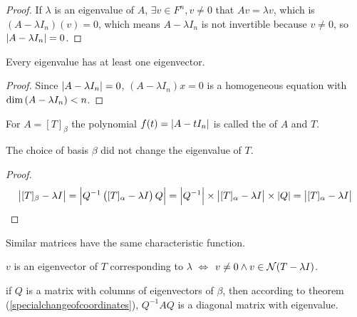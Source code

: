 \begin{proof}
    If $\lambda$ is an eigenvalue of $A$, $\exists v \in F^n, v \neq 0$ that $A v = \lambda v$, which is $(A - \lambda I_n)(v)= 0$, which means $A - \lambda I_n$ is not invertible because $v \neq 0$, so $\displaystyle \left| \displaystyle A - \lambda I_n \right| = 0$.
\end{proof}

\begin{theorem}
    Every eigenvalue has at least one eigenvector.    
\end{theorem}
\begin{proof}
    Since $\displaystyle \left| \displaystyle A - \lambda I_n \right| = 0$, $(A - \lambda I_n) x = 0$ is a homogeneous equation with $\displaystyle \text{dim}\left( A - \lambda I_n \right) < n$.
\end{proof}



\begin{definition}
    For $A = [T]_\beta$ the polynomial $f(t) = \displaystyle \left| \displaystyle A - t I_n \right|$ is called the  of $A$ and $T$. 
\end{definition}

\begin{theorem}
    The choice of basis $\beta$ did not change the eigenvalue of $T$. 
\end{theorem}
\begin{proof}
    \begin{equation*}
        \displaystyle \left\lvert [T]_\beta - \lambda I \right\rvert = \displaystyle \left\lvert Q^{-1} \left( [T]_\alpha - \lambda I \right) Q \right\rvert = \displaystyle \left\lvert Q^{-1} \right\rvert \times \displaystyle \left\lvert [T]_\alpha - \lambda I  \right\rvert \times \displaystyle \left\lvert Q \right\rvert = \displaystyle \left\lvert [T]_\alpha - \lambda I  \right\rvert 
    \end{equation*}
\end{proof}

\begin{theorem}
Similar matrices have the same characteristic function.    
\end{theorem}



\begin{theorem}
    $v$ is an eigenvector of $T$ corresponding to $\lambda$ $\iff$ $v \neq 0 \wedge v \in \mathcal{N}(T - \lambda I)$.
\end{theorem}

\begin{theorem}
    if $Q$ is a matrix with columns of eigenvectors of $\beta$, then according to theorem (\ref{specialchangeofcoordinates}), $Q^{-1} A Q$ is a diagonal matrix with eigenvalue.
\end{theorem}



